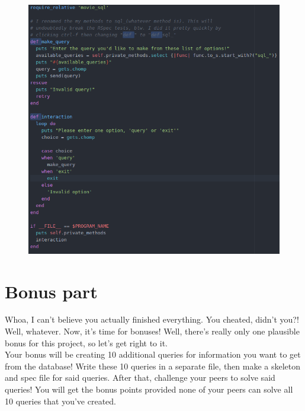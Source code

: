 \documentclass{42-en}
\begin{document}
	\begin{figure}[H]
		\begin{center}
			\includegraphics[width=15cm]{wrapper.png}
		\end{center}
	\end{figure}

\nextexercice


\chapter{Bonus part}

	Whoa, I can't believe you actually finished everything. You cheated, didn't you?! 
	Well, whatever. Now, it's time for bonuses! Well, there's really only one 
	plausible bonus for this project, so let's get right to it. \\ 

	Your bonus will be creating 10 additional queries for information you want 
	to get from the database! Write these 10 queries in a separate file, 
	then make a skeleton and spec file for said queries. After that, challenge 
	your peers to solve said queries! You will get the bonus points provided 
	none of your peers can solve all 10 queries that you've created. \\ 
\end{document}
